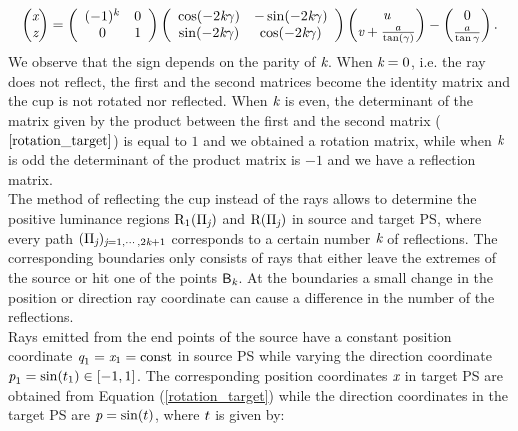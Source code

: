\begin{equation} \label{rotation_target}\begin{pmatrix} \textit{x}\\ \textit{z}
\end{pmatrix} = \left(\begin{array}{cc}(-1)^k & 0  \\ 0 & 1\end{array}\right)
\left(\begin{array}{cc}\cos(-2\textit{k}\gamma) & -\sin(-2\textit{k}\gamma) \\\sin(-2\textit{k}\gamma) & \cos(-2\textit{k}\gamma)\end{array}\right)\begin{pmatrix} \textit{u} \\
 \textit{v}+\frac{a}{\tan(\gamma)}\end{pmatrix}-\begin{pmatrix}0 \\ \frac{a}{\tan\gamma}\end{pmatrix}.
\end{equation} We observe that the sign depends on the parity of $\textit{k}$. When $\textit{k}=0$, i.e. the ray does not reflect, the first and the second matrices become the identity matrix and the cup is not rotated nor reflected. When $\textit{k}$ is even, the determinant of the matrix given by the product between the first and the second matrix ($\ref{rotation_target}$) is equal to $1$ and we obtained a rotation matrix, while when $\textit{k}$ is odd the determinant of the product matrix is $-1$ and we have a reflection matrix.
\\ \indent
The method of reflecting the cup instead of the rays allows to determine the positive luminance regions $\mbox{$\textup{R}$}_1(\Pi_{\textit{j}})$ and $\mbox{$\textup{R}$}(\Pi_{\textit{j}})$ in source and target PS, where every path $(\Pi_{\textit{j}})_{\textit{j}=1, \cdots, 2\textit{k}+1}$ corresponds to a certain number $\textit{k}$ of reflections. The corresponding boundaries only consists of rays that either leave the extremes of the source or hit one of the points $\textsf{B}_{\textit{k}}$. At the boundaries a small change in the position or direction ray coordinate can cause a difference in the number of the reflections. \\
\indent Rays emitted from the end points of the source have a constant position coordinate $\textit{q}_1 = \textit{x}_1 = \textrm{const}$ in source PS while varying the direction coordinate $\textit{p}_1 = \sin(t_1)\in[-1, 1]$. The corresponding position coordinates $\textit{x}$ in target PS are obtained from Equation (\ref{rotation_target}) while the direction coordinates in the target PS are $\textit{p} = \sin(t)$, where $t$ is given by: 
